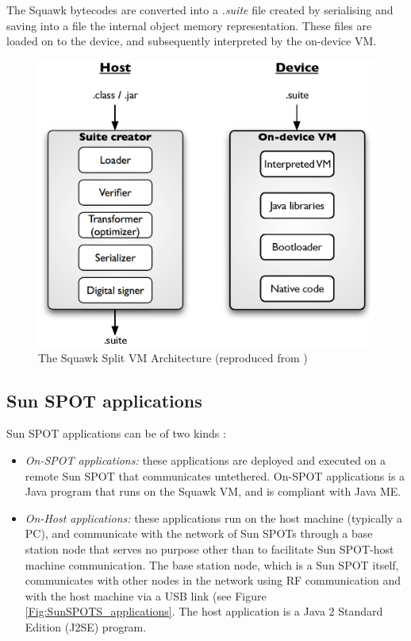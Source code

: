 The Squawk bytecodes are converted into a \emph{.suite} file created by
serialising and saving into a file the internal object memory representation.
These files are loaded on to the device, and subsequently interpreted by the
on-device VM.
  
\begin{figure}
\centering
\label{Fig:SquawkVM_architecture}
\includegraphics[scale=0.71]{img/Squawk_architecture.eps} \caption[The Squawk
Split VM Architecture]{The Squawk
Split VM Architecture (reproduced from \cite{simon_squawk:2006})}
\end{figure}   
  

\subsection{Sun SPOT applications} \label{subsec:sunspotapps}

Sun SPOT applications can be of two kinds \cite{sun_developer:2008}:

\begin{itemize}
  \item \emph{On-SPOT applications:} these applications are deployed and
  executed on a remote Sun SPOT that communicates untethered. On-SPOT
  applications is a Java program that runs on the Squawk VM, and is compliant
  with Java ME. 
  \item \emph{On-Host applications:} these applications run on the host machine
  (typically a PC), and communicate with the network of Sun SPOTs through a base
  station node that serves no purpose other than to facilitate Sun SPOT-host
  machine communication. 
  The base station node, which is a Sun SPOT itself, communicates with other
  nodes in the network using RF communication and with the host machine via a
  USB link (see Figure \ref{Fig:SunSPOTS_applications}. The host application is a Java 2 Standard
  Edition (J2SE) program.

\end{itemize}

